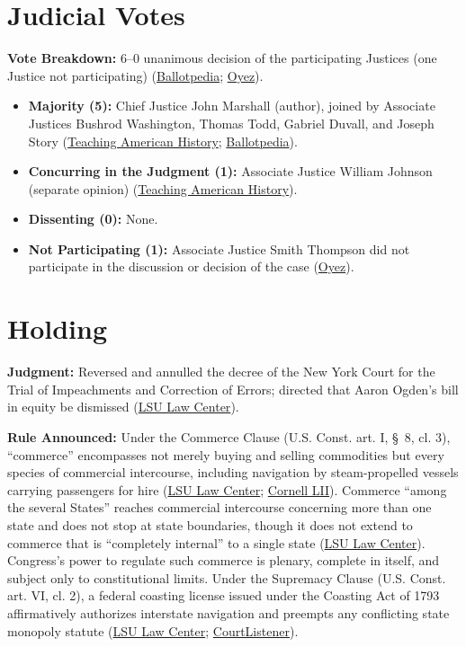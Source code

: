 \documentclass[12pt]{article}
\begin{document}
\section{Judicial Votes}
\textbf{Vote Breakdown:} 6--0 unanimous decision of the participating Justices (one Justice not participating) (\href{https://ballotpedia.org/Gibbons_v._Ogden}{Ballotpedia}; \href{https://www.oyez.org/cases/1789-1850/22us1}{Oyez}).
\begin{itemize}
\item \textbf{Majority (5):} Chief Justice John Marshall (author), joined by Associate Justices Bushrod Washington, Thomas Todd, Gabriel Duvall, and Joseph Story (\href{https://teachingamericanhistory.org/document/gibbons-v-ogden/}{Teaching American History}; \href{https://ballotpedia.org/Gibbons_v._Ogden}{Ballotpedia}).
\item \textbf{Concurring in the Judgment (1):} Associate Justice William Johnson (separate opinion) (\href{https://teachingamericanhistory.org/document/gibbons-v-ogden/}{Teaching American History}).
\item \textbf{Dissenting (0):} None.
\item \textbf{Not Participating (1):} Associate Justice Smith Thompson did not participate in the discussion or decision of the case (\href{https://www.oyez.org/cases/1789-1850/22us1}{Oyez}).
\end{itemize}

\section{Holding}
\textbf{Judgment:} Reversed and annulled the decree of the New York Court for the Trial of Impeachments and Correction of Errors; directed that Aaron Ogden's bill in equity be dismissed (\href{https://biotech.law.lsu.edu/cases/pp/Gibbons.htm}{LSU Law Center}).

\textbf{Rule Announced:} Under the Commerce Clause (U.S. Const. art. I, \S~8, cl. 3), ``commerce'' encompasses not merely buying and selling commodities but every species of commercial intercourse, including navigation by steam-propelled vessels carrying passengers for hire (\href{https://biotech.law.lsu.edu/cases/pp/Gibbons.htm}{LSU Law Center}; \href{https://www.law.cornell.edu/wex/enumerated_powers}{Cornell LII}). Commerce ``among the several States'' reaches commercial intercourse concerning more than one state and does not stop at state boundaries, though it does not extend to commerce that is ``completely internal'' to a single state (\href{https://biotech.law.lsu.edu/cases/pp/Gibbons.htm}{LSU Law Center}). Congress's power to regulate such commerce is plenary, complete in itself, and subject only to constitutional limits. Under the Supremacy Clause (U.S. Const. art. VI, cl. 2), a federal coasting license issued under the Coasting Act of 1793 affirmatively authorizes interstate navigation and preempts any conflicting state monopoly statute (\href{https://biotech.law.lsu.edu/cases/pp/Gibbons.htm}{LSU Law Center}; \href{https://www.courtlistener.com/opinion/85412/gibbons-v-ogden/}{CourtListener}).
\end{document}
